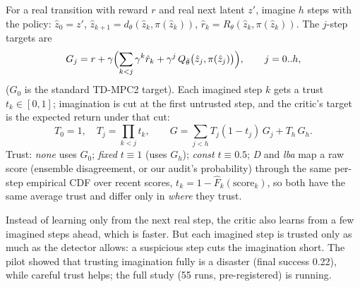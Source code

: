 \documentclass[11pt]{article}
\begin{document}
For a real transition with reward $r$ and real next latent $z'$, imagine $h$ steps with the policy:
$\hat z_0=z'$, $\hat z_{k+1}=d_\theta(\hat z_k,\pi(\hat z_k))$, $\hat r_k=R_\theta(\hat z_k,\pi(\hat z_k))$. The $j$-step
targets are
\[
G_j=r+\gamma\Bigl(\sum_{k<j}\gamma^k\hat r_k+\gamma^j\,Q_{\bar\theta}\bigl(\hat z_j,\pi(\hat z_j)\bigr)\Bigr),\qquad j=0..h,
\]
($G_0$ is the standard TD-MPC2 target). Each imagined step $k$ gets a trust $t_k\in[0,1]$; imagination is cut at
the first untrusted step, and the critic's target is the expected return under that cut:
\[
T_0=1,\quad T_j=\prod_{k<j}t_k,\qquad
G=\sum_{j<h}T_j(1-t_j)\,G_j+T_h\,G_h .
\]
Trust: \emph{none} uses $G_0$; \emph{fixed} $t\equiv1$ (uses $G_h$); \emph{const} $t\equiv0.5$; \emph{D} and \emph{lba}
map a raw score (ensemble disagreement, or our audit's probability) through the same per-step empirical CDF over
recent scores, $t_k=1-\widehat{F}_k(\text{score}_k)$, so both have the same average trust and differ only in
\emph{where} they trust.

\begin{inwords}
Instead of learning only from the next real step, the critic also learns from a few imagined steps ahead, which is
faster. But each imagined step is trusted only as much as the detector allows: a suspicious step cuts the
imagination short. The pilot showed that trusting imagination fully is a disaster (final success 0.22), while
careful trust helps; the full study (55 runs, pre-registered) is running.
\end{inwords}
\end{document}
